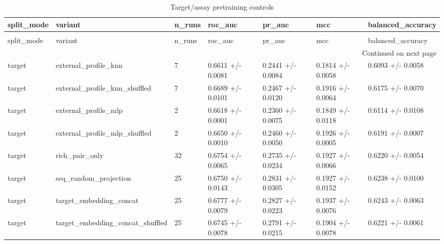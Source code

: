 \begin{longtable}{lllllll}
\caption{Target/assay pretraining controls} \label{tab:table_10b_target_assay_pretraining_controls} \\
\toprule
split\_mode & variant & n\_runs & roc\_auc & pr\_auc & mcc & balanced\_accuracy \\
\midrule
\endfirsthead
\caption[]{Target/assay pretraining controls} \\
\toprule
split\_mode & variant & n\_runs & roc\_auc & pr\_auc & mcc & balanced\_accuracy \\
\midrule
\endhead
\midrule
\multicolumn{7}{r}{Continued on next page} \\
\midrule
\endfoot
\bottomrule
\endlastfoot
target & external\_profile\_knn & 7 & 0.6611 +/- 0.0081 & 0.2441 +/- 0.0084 & 0.1814 +/- 0.0058 & 0.6093 +/- 0.0058 \\
target & external\_profile\_knn\_shuffled & 7 & 0.6689 +/- 0.0101 & 0.2467 +/- 0.0120 & 0.1916 +/- 0.0064 & 0.6175 +/- 0.0070 \\
target & external\_profile\_mlp & 2 & 0.6618 +/- 0.0001 & 0.2360 +/- 0.0075 & 0.1849 +/- 0.0118 & 0.6114 +/- 0.0108 \\
target & external\_profile\_mlp\_shuffled & 2 & 0.6650 +/- 0.0010 & 0.2460 +/- 0.0050 & 0.1926 +/- 0.0005 & 0.6191 +/- 0.0007 \\
target & rich\_pair\_only & 32 & 0.6754 +/- 0.0065 & 0.2735 +/- 0.0234 & 0.1927 +/- 0.0066 & 0.6220 +/- 0.0054 \\
target & seq\_random\_projection & 25 & 0.6750 +/- 0.0143 & 0.2831 +/- 0.0305 & 0.1927 +/- 0.0152 & 0.6238 +/- 0.0100 \\
target & target\_embedding\_concat & 25 & 0.6777 +/- 0.0079 & 0.2827 +/- 0.0223 & 0.1937 +/- 0.0076 & 0.6243 +/- 0.0063 \\
target & target\_embedding\_concat\_shuffled & 25 & 0.6745 +/- 0.0078 & 0.2791 +/- 0.0215 & 0.1904 +/- 0.0078 & 0.6221 +/- 0.0061 \\
\end{longtable}
